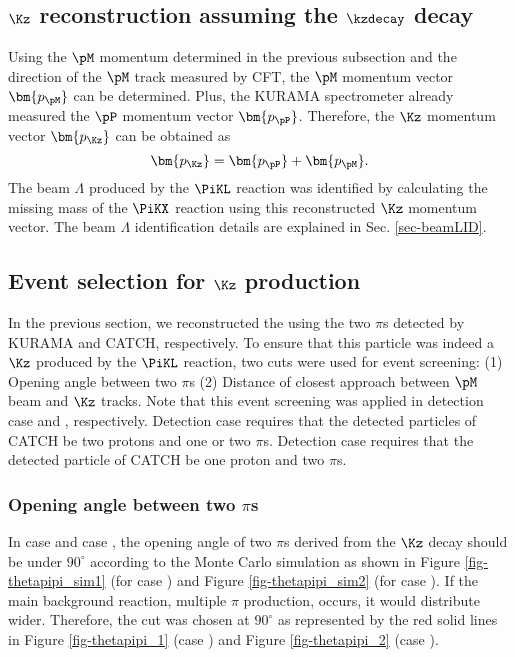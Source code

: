 \clearpage
\subsection{$\Kz$ reconstruction assuming the $\kzdecay$ decay}
Using the $\pM$ momentum determined in the previous subsection and the direction of the $\pM$ track measured by CFT, the $\pM$ momentum vector $\bm{p_{\pM}}$ can be determined. Plus, the KURAMA spectrometer already measured the $\pP$ momentum vector $\bm{p_{\pP}}$. Therefore, the $\Kz$ momentum vector $\bm{p_{\Kz}}$ can be obtained as
\begin{equation}
  \bm{p_{\Kz}} = \bm{p_{\pP}} + \bm{p_{\pM}}.
\end{equation}
The beam $\Lambda$ produced by the $\PiKL$ reaction was identified by calculating the missing mass of the $\PiKX$ reaction using this reconstructed $\Kz$ momentum vector. The beam $\Lambda$ identification details are explained in Sec. \ref{sec-beamLID}.

\subsection{Event selection for $\Kz$ production}
\label{sec-Lbeam-EVselect}
In the previous section, we reconstructed the  using the two $\pi$s detected by KURAMA and CATCH, respectively. To ensure that this particle was indeed a $\Kz$ produced by the $\PiKL$ reaction, two cuts were used for event screening: (1) Opening angle between two $\pi$s (2) Distance of closest approach between $\pM$ beam and $\Kz$ tracks. Note that this event screening was applied in detection case  and , respectively. Detection case  requires that the detected particles of CATCH be two protons and one or two $\pi$s. Detection case  requires that the detected particle of CATCH be one proton and two $\pi$s. 

\subsubsection{Opening angle between two $\pi$s}
In case  and case , the opening angle of two $\pi$s derived from the $\Kz$ decay should be under $90^{\circ}$ according to the Monte Carlo simulation as shown in Figure \ref{fig-thetapipi_sim1} (for case ) and Figure \ref{fig-thetapipi_sim2} (for case ). If the main background reaction, multiple $\pi$ production, occurs, it would distribute wider. Therefore, the cut was chosen at $90^{\circ}$ as represented by the red solid lines in Figure \ref{fig-thetapipi_1} (case ) and Figure \ref{fig-thetapipi_2} (case ). 

